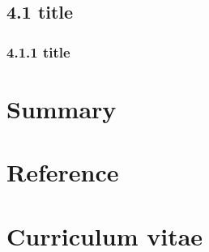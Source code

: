 \documentclass[a4paper,12pt,UTF8,openright]{book}
\begin{document}
\section{4.1 title}
\lipsum[1-5]

\subsection{4.1.1 title}
\lipsum[1-5]

\chapter{Summary}
\lipsum[1-5]

\chapter{Reference}

\chapter*{Curriculum vitae}
\lipsum[1-5]
	
\end{document}
